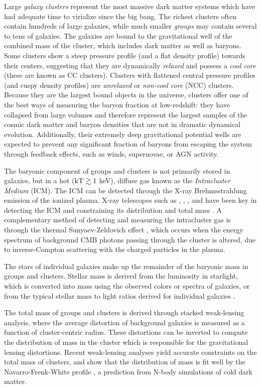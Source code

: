 Large \textit{galaxy clusters} represent the most massive dark matter
systems which have had adequate time to virialize since the big
bang. The richest clusters often contain hundreds of large galaxies,
while much smaller \textit{groups} may contain several to tens of
galaxies. The galaxies are bound to the gravitational well of the
combined mass of the cluster, which includes dark matter as well as
baryons. Some clusters show a steep pressure profile (and a flat
density profile) towards their centers, suggesting that they are
dynamically \textit{relaxed} and possess a \textit{cool core} (these
are known as CC clusters). Clusters with flattened central pressure
profiles (and cuspy density profiles) are \textit{unrelaxed} or
\textit{non-cool core} (NCC) clusters. Because they are the largest
bound objects in the universe, clusters offer one of the best ways of
measuring the baryon fraction at low-redshift: they have collapsed
from large volumes and therefore represent the largest samples of the
cosmic dark matter and baryon densities that are not in dramatic
dynamical evolution. Additionally, their extremely deep gravitational
potential wells are expected to prevent any significant fraction of
baryons from escaping the system through feedback effects, such as
winds, supernovae, or AGN activity.

The baryonic component of groups and clusters is not primarily stored in
galaxies, but in a hot ($\textrm{kT} \gtrsim 1$ keV), diffuse gas known
as the \textit{Intracluster Medium} (ICM). The ICM can be detected
through the X-ray Brehmsstrahlung emission of the ionized
plasma. X-ray telescopes such as \Chandra, \Rosat, \Suzaku, and \XMM{}
have been key in detecting the ICM and constraining its distribution
and total mass . A complementary
method of detecting and measuring the intracluster gas is through the
thermal Sunyaev-Zeldovich effect \citep[SZ,][]{Sunyaev1972}, which
occurs when the energy spectrum of background CMB photons passing
through the cluster is altered, due to inverse-Compton scattering with
the charged particles in the plasma.

The stars of individual galaxies make up the remainder of the baryonic
mass in groups and clusters. Stellar mass is derived from the
luminosity in starlight, which is converted into mass using the
observed colors or spectra of galaxies, or from the typical stellar
mass to light ratios derived for individual galaxies
\citep{Bahcall2014}.

The total mass of groups and clusters is derived through stacked
weak-lensing analysis, where the average distortion of background
galaxies is measured as a function of cluster-centric radius. These
distortions can be inverted to compute the distribution of mass in the
cluster which is responsible for the gravitational lensing
distortions. Recent weak-lensing analyses \citep{Mandelbaum2008,
  Sheldon2009a} yield accurate constraints on the total mass of
clusters, and show that the distribution of mass is fit well by the
Navarro-Frenk-White profile \citep[NFW,][]{Navarro1996}, a prediction
from N-body simulations of cold dark matter.

